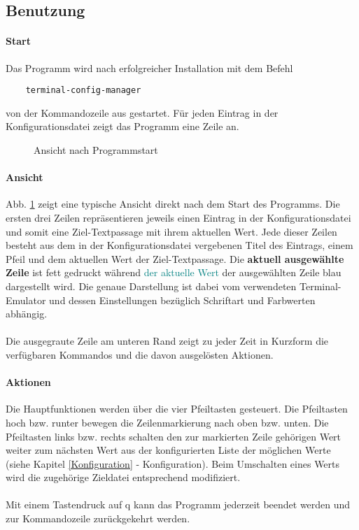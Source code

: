 \subsection{Benutzung} \label{Benutzung}
\paragraph{Start}
Das Programm wird nach erfolgreicher Installation mit dem Befehl

\begin{verbatim}
    terminal-config-manager
\end{verbatim}

von der Kommandozeile aus gestartet. Für jeden Eintrag in der Konfigurationsdatei
zeigt das Programm eine Zeile an.

\begin{figure}
    \caption{Ansicht nach Programmstart}
    \label{post-start}
    \begin{center}
    \end{center}
\end{figure}

\paragraph{Ansicht}
Abb. \ref{post-start} zeigt eine typische Ansicht direkt nach dem Start des
Programms. Die ersten drei Zeilen repräsentieren jeweils einen Eintrag in
der Konfigurationsdatei und somit eine Ziel-\gls{Textpassage} mit ihrem
aktuellen Wert. Jede dieser Zeilen besteht aus dem in der Konfigurationsdatei
vergebenen Titel des Eintrags, einem Pfeil und dem aktuellen Wert der Ziel-\gls{Textpassage}.
Die \textbf{aktuell ausgewählte Zeile} ist fett gedruckt während
\textcolor{teal}{der aktuelle Wert} der ausgewählten Zeile blau dargestellt wird.
Die genaue Darstellung ist dabei vom verwendeten Terminal-Emulator und dessen
Einstellungen bezüglich Schriftart und Farbwerten abhängig.

\paragraph{}
Die ausgegraute Zeile am unteren Rand zeigt zu jeder Zeit in Kurzform die verfügbaren
Kommandos und die davon ausgelösten Aktionen.

\paragraph{Aktionen}
Die Hauptfunktionen werden über die vier Pfeiltasten gesteuert. Die Pfeiltasten
hoch bzw. runter bewegen die Zeilenmarkierung nach oben bzw. unten. Die Pfeiltasten
links bzw. rechts schalten den zur markierten Zeile gehörigen Wert weiter zum
nächsten Wert aus der konfigurierten Liste der möglichen Werte
(siehe Kapitel \ref{Konfiguration} - Konfiguration). Beim Umschalten eines Werts
wird die zugehörige Zieldatei entsprechend modifiziert.

\paragraph{} Mit einem Tastendruck auf q kann das Programm jederzeit beendet werden
und zur Kommandozeile zurückgekehrt werden.